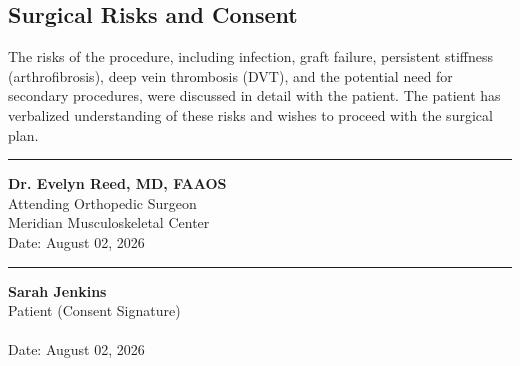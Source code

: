 \subsection{Surgical Risks and Consent}
The risks of the procedure, including infection, graft failure, persistent stiffness (arthrofibrosis), deep vein thrombosis (DVT), and the potential need for secondary procedures, were discussed in detail with the patient. The patient has verbalized understanding of these risks and wishes to proceed with the surgical plan.

\vspace{0.8cm}

\begin{minipage}[t]{0.45\textwidth}
  \hrule
  \vspace{0.2cm}
  \textbf{Dr. Evelyn Reed, MD, FAAOS} \\
  Attending Orthopedic Surgeon \\
  Meridian Musculoskeletal Center \\
  Date: August 02, 2026
\end{minipage}
\hfill
\begin{minipage}[t]{0.45\textwidth}
  \hrule
  \vspace{0.2cm}
  \textbf{Sarah Jenkins} \\
  Patient (Consent Signature) \\
  \\
  Date: August 02, 2026
\end{minipage}
